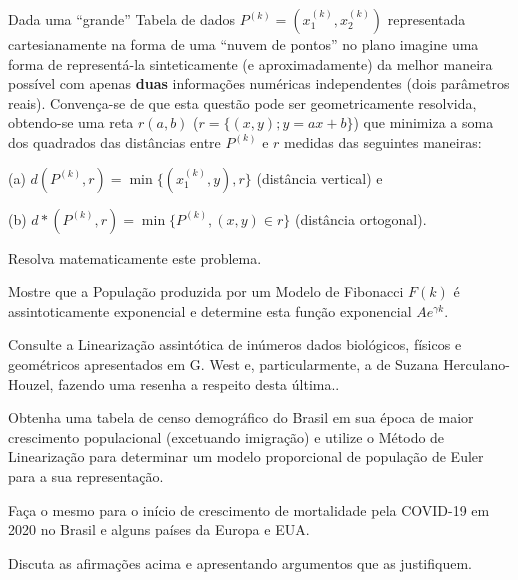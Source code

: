 \begin{exercise}
Dada uma ``grande'' Tabela de dados \(P^{(k)} = (x_{1}^{(k)}, x_{2}^{(k)})\) representada cartesianamente na forma de uma ``nuvem de pontos'' no plano imagine uma forma de representá-la sinteticamente (e aproximadamente) da melhor maneira possível com apenas \textbf{duas} informações numéricas independentes (dois parâmetros reais). Convença-se de que esta questão pode ser geometricamente resolvida, obtendo-se uma reta \(r(a, b)\) (\(r = \{(x, y); y = ax+b\}\)) que minimiza a soma dos quadrados das distâncias entre \(P^{(k)}\) e \(r\) medidas das seguintes maneiras:
\begin{description}
\item (a) \(d(P^{(k)}, r) = \min\{(x_{1}^{(k)}, y), r\}\) (distância vertical) e
\item (b) \(d\ast(P^{(k)}, r) = \min\{P^{(k)}, (x, y) \in r\}\) (distância ortogonal).
\end{description}

Resolva matematicamente este problema.
\end{exercise}

\begin{exercise}
Mostre que a População produzida por um Modelo de Fibonacci \(F(k)\) é assintoticamente exponencial e determine esta função exponencial \(A e^{\gamma k}\).
\end{exercise}

\begin{exercise}
Consulte a Linearização assintótica de inúmeros dados biológicos, físicos e geométricos apresentados em G. West e, particularmente, a de Suzana Herculano-Houzel, fazendo uma resenha a respeito desta última..
\end{exercise}

\begin{exercise}
Obtenha uma tabela de censo demográfico do Brasil em sua época de maior crescimento populacional (excetuando imigração) e utilize o Método de Linearização para determinar um modelo proporcional de população de Euler para a sua representação.
\end{exercise}

\begin{exercise}
Faça o mesmo para o início de crescimento de mortalidade pela COVID-19 em 2020 no Brasil e alguns países da Europa e EUA.
\end{exercise}



\begin{exercise}
Discuta as afirmações acima e apresentando argumentos que as justifiquem.
\end{exercise}




